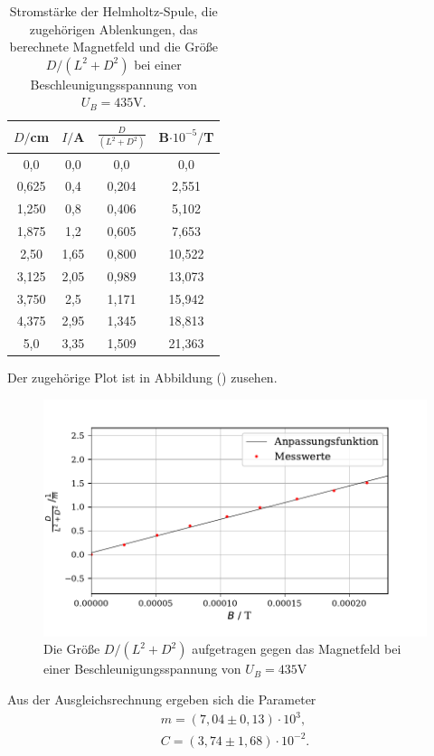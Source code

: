 \begin{table}[H]
  \centering
  \caption{Stromstärke der Helmholtz-Spule, die zugehörigen Ablenkungen, das berechnete Magnetfeld und die Größe $D/(L^2+D^2)$ bei einer Beschleunigungsspannung von $U_B = 435 \si{\volt}$.}
  \label{tab:Parameter}
  \begin{tabular}{c c c c}
    \toprule
    $D/$cm& $I/$A & $\frac{D}{(L^2+D^2)}$ & $ $B$ \cdot 10^{-5} /$T\\
    \bottomrule
    0,0 & 0,0 & 0,0 & 0,0\\
    0,625 & 0,4 & 0,204 & 2,551 \\
    1,250 & 0,8 & 0,406 & 5,102\\
    1,875 & 1,2 & 0,605 & 7,653\\
    2,50 & 1,65 & 0,800 & 10,522\\
    3,125 & 2,05 & 0,989 & 13,073\\
    3,750 & 2,5 & 1,171 & 15,942\\
    4,375 & 2,95 & 1,345 & 18,813\\
    5,0 & 3,35 & 1,509 & 21,363\\
    
     \bottomrule
  \end{tabular}
\end{table}

Der zugehörige Plot ist in Abbildung () zusehen.


\begin{figure}[H]
  \centering
  \includegraphics{plot2.pdf}
  \caption{Die Größe $D/(L^2+D^2)$ aufgetragen gegen das Magnetfeld bei einer Beschleunigungsspannung von $U_B = 435\si{\volt}$}
  \label{fig:plot}
\end{figure}

Aus der Ausgleichsrechnung ergeben sich die Parameter
\begin{align*}
    m = (7,04 \pm 0,13) \cdot 10^{3} ,\\
    C = (3,74 \pm 1,68) \cdot 10^{-2} .
\end{align*}

